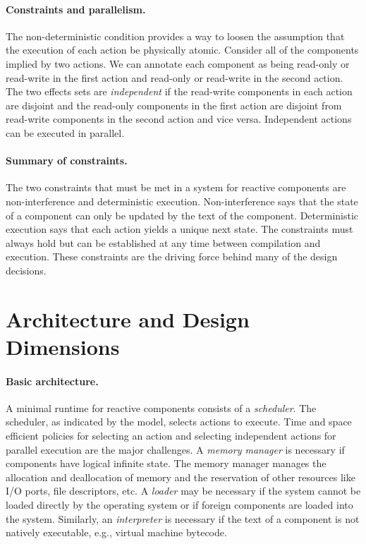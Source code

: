 \documentclass[letterpaper]{article}
\theoremstyle{definition} \newtheorem{constraint}{Constraint}
\begin{document}
\paragraph{Constraints and parallelism.}
The non-deterministic condition provides a way to loosen the assumption that the execution of each action be physically atomic.
Consider all of the components implied by two actions.
We can annotate each component as being read-only or read-write in the first action and read-only or read-write in the second action.
The two effects sets are \emph{independent} if the read-write components in each action are disjoint and the read-only components in the first action are disjoint from read-write components in the second action and vice versa.
Independent actions can be executed in parallel.

\paragraph{Summary of constraints.}
The two constraints that must be met in a system for reactive components are non-interference and deterministic execution.
Non-interference says that the state of a component can only be updated by the text of the component.
Deterministic execution says that each action yields a unique next state.
The constraints must always hold but can be established at any time between compilation and execution.
These constraints are the driving force behind many of the design decisions.

\section{Architecture and Design Dimensions\label{architecture}}

\paragraph{Basic architecture.}
A minimal runtime for reactive components consists of a \emph{scheduler}.
The scheduler, as indicated by the model, selects actions to execute.
Time and space efficient policies for selecting an action and selecting independent actions for parallel execution are the major challenges.
A \emph{memory manager} is necessary if components have logical infinite state.
The memory manager manages the allocation and deallocation of memory and the reservation of other resources like I/O ports, file descriptors, etc.
A \emph{loader} may be necessary if the system cannot be loaded directly by the operating system or if foreign components are loaded into the system.
Similarly, an \emph{interpreter} is necessary if the text of a component is not natively executable, e.g., virtual machine bytecode.
\end{document}
